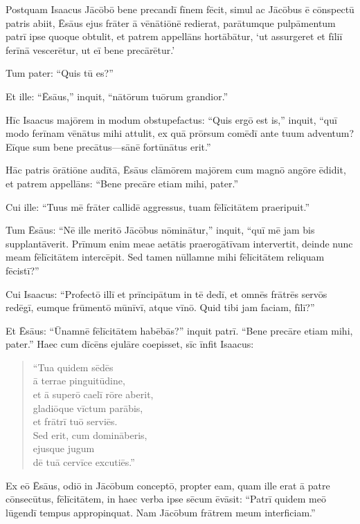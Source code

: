 \Versus Postquam Isaacus Jācōbō bene precandī fīnem fēcit, simul ac Jācōbus ē cōnspectū patris abiit, Ēsāus ejus frāter ā vēnātiōnē redierat,
\Versus parātumque pulpāmentum patrī ipse quoque obtulit, et patrem appellāns hortābātur, `ut assurgeret et fīliī ferīnā vescerētur, ut eī bene precārētur.'

\Versus Tum pater: ``Quis tū es?''

Et ille: ``Ēsāus,'' inquit, ``nātōrum tuōrum grandior.''

\Versus Hīc Isaacus majōrem in modum obstupefactus: ``Quis ergō est is,'' inquit, ``quī modo ferīnam vēnātus mihi attulit, ex quā prōrsum comēdī ante tuum adventum? Eīque sum bene precātus—sānē fortūnātus erit.''

\Versus Hāc patris ōrātiōne audītā, Ēsāus clāmōrem majōrem cum magnō angōre ēdidit, et patrem appellāns: ``Bene precāre etiam mihi, pater.''

\Versus Cui ille: ``Tuus mē frāter callidē aggressus, tuam fēlīcitātem praeripuit.''

\Versus Tum Ēsāus: ``Nē ille meritō Jācōbus nōminātur,'' inquit, ``quī mē jam bis supplantāverit. Prīmum enim meae aetātis praerogātīvam intervertit, deinde nunc meam fēlīcitātem intercēpit. Sed tamen nūllamne mihi fēlīcitātem reliquam fēcistī?''

\Versus Cui Isaacus: ``Profectō illī et prīncipātum in tē dedī, et omnēs frātrēs servōs redēgī, eumque frūmentō mūnīvī, atque vīnō. Quid tibi jam faciam, fīlī?''

\Versus Et Ēsāus: ``Ūnamnē fēlīcitātem habēbās?'' inquit patrī. ``Bene precāre etiam mihi, pater.''
Haec cum dīcēns ejulāre coepisset,
\Versus sīc īnfit Isaacus:

\begin{verse}
\begin{patverse*}
``Tua quidem sēdēs\\
 ā terrae pinguitūdine,\\
 et ā superō caelī rōre aberit,\\
\Versus gladiōque vīctum parābis,\\
 et frātrī tuō serviēs.\\
 Sed erit, cum domināberis,\\
 ejusque jugum \\
 dē tuā cervīce excutiēs.''
\end{patverse*}
\end{verse}

\Versus Ex eō Ēsāus, odiō in Jācōbum conceptō, propter eam, quam ille erat ā patre cōnsecūtus, fēlīcitātem, in haec verba ipse sēcum ēvāsit: ``Patrī quidem meō lūgendī tempus appropinquat. Nam Jācōbum frātrem meum interficiam.''

